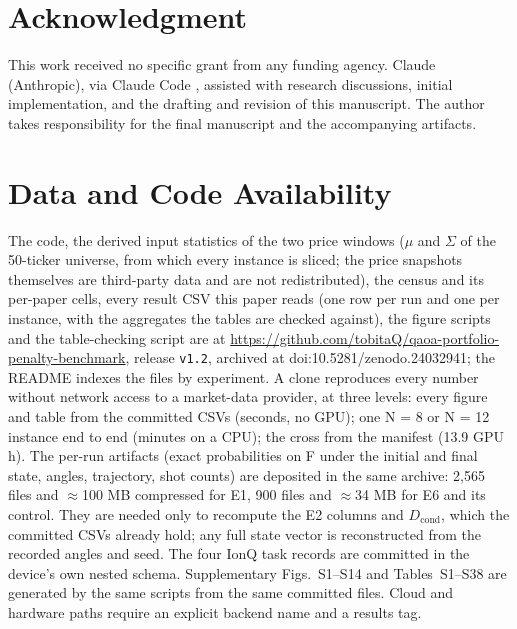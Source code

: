 \documentclass[journal]{IEEEtran}
\begin{document}
\section*{Acknowledgment}


This work received no specific grant from any funding agency. Claude (Anthropic), via Claude Code \cite{ref49}, assisted with research discussions, initial implementation, and the drafting and revision of this manuscript. The author takes responsibility for the final manuscript and the accompanying artifacts.


\section*{Data and Code Availability}

The code, the derived input statistics of the two price windows ($\mu$ and $\Sigma$ of the 50-ticker universe, from which every instance is sliced; the price snapshots themselves are third-party data and are not redistributed), the census and its per-paper cells, every result CSV this paper reads (one row per run and one per instance, with the aggregates the tables are checked against), the figure scripts and the table-checking script are at \url{https://github.com/tobitaQ/qaoa-portfolio-penalty-benchmark}, release \texttt{v1.2}, archived at doi:10.5281/zenodo.24032941; the README indexes the files by experiment. A clone reproduces every number without network access to a market-data provider, at three levels: every figure and table from the committed CSVs (seconds, no GPU); one N = 8 or N = 12 instance end to end (minutes on a CPU); the cross from the manifest (13.9 GPU h). The per-run artifacts (exact probabilities on F under the initial and final state, angles, trajectory, shot counts) are deposited in the same archive: 2,565 files and $\approx$100 MB compressed for E1, 900 files and $\approx$34 MB for E6 and its control. They are needed only to recompute the E2 columns and $D_{\mathrm{cond}}$, which the committed CSVs already hold; any full state vector is reconstructed from the recorded angles and seed. The four IonQ task records are committed in the device's own nested schema. Supplementary Figs.~S1--S14 and Tables~S1--S38 are generated by the same scripts from the same committed files. Cloud and hardware paths require an explicit backend name and a results tag.
\end{document}
